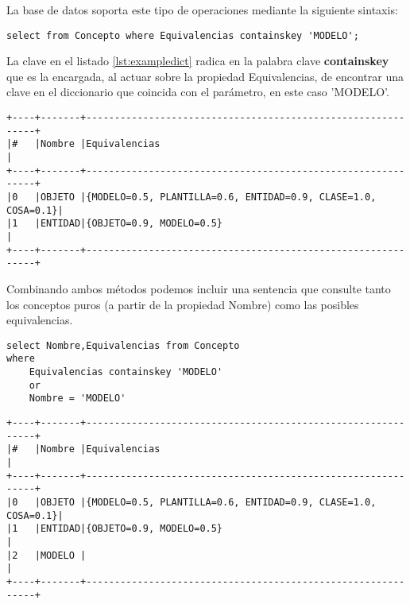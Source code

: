 \documentclass[a4paper,headsepline,footsepline,draft=false]{scrartcl}
\begin{document}
La base de datos soporta este tipo de operaciones mediante la siguiente sintaxis:

\begin{lstlisting}[caption={Sentencia SELECT con diccionario},label=lst:exampledict]
select from Concepto where Equivalencias containskey 'MODELO';
\end{lstlisting}

La clave en el listado \ref{lst:exampledict} radica en la palabra clave \textbf{containskey} que es la encargada, al actuar sobre la propiedad Equivalencias, de encontrar una clave en el diccionario que coincida con el parámetro, en este caso 'MODELO'.

{\tiny
\begin{lstlisting}
+----+-------+-------------------------------------------------------------+
|#   |Nombre |Equivalencias                                                |
+----+-------+-------------------------------------------------------------+
|0   |OBJETO |{MODELO=0.5, PLANTILLA=0.6, ENTIDAD=0.9, CLASE=1.0, COSA=0.1}|
|1   |ENTIDAD|{OBJETO=0.9, MODELO=0.5}                                     |
+----+-------+-------------------------------------------------------------+
\end{lstlisting}
}

Combinando ambos métodos podemos incluir una sentencia que consulte tanto los conceptos puros (a partir de la propiedad Nombre) como las posibles equivalencias.

\begin{lstlisting}[caption={Sentencia SELECT compuesta},label={lst:selectcompuesto}]
select Nombre,Equivalencias from Concepto 
where 
	Equivalencias containskey 'MODELO' 
	or 
	Nombre = 'MODELO'
\end{lstlisting}

{\tiny
\begin{lstlisting}[caption={Resultado de la consulta por 'MODELO'}]
+----+-------+-------------------------------------------------------------+
|#   |Nombre |Equivalencias                                                |
+----+-------+-------------------------------------------------------------+
|0   |OBJETO |{MODELO=0.5, PLANTILLA=0.6, ENTIDAD=0.9, CLASE=1.0, COSA=0.1}|
|1   |ENTIDAD|{OBJETO=0.9, MODELO=0.5}                                     |
|2   |MODELO |                                                             |
+----+-------+-------------------------------------------------------------+
\end{lstlisting}
}
\end{document}
